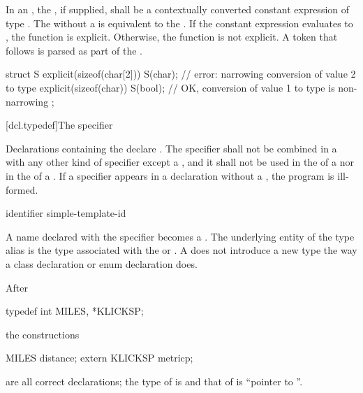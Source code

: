 \pnum
In an ,
the , if supplied, shall be a
contextually converted constant expression of type .
The  
without a  is equivalent to
the  .
If the constant expression evaluates to ,
the function is explicit. Otherwise, the function is not explicit.
A \tcode{(} token that follows  is parsed as
part of the .
\begin{example}
\begin{codeblock}
struct S {
  explicit(sizeof(char[2])) S(char);    // error: narrowing conversion of value 2 to type 
  explicit(sizeof(char)) S(bool);       // OK, conversion of value 1 to type  is non-narrowing
};
\end{codeblock}
\end{example}

[dcl.typedef]{The  specifier}%

\pnum
Declarations containing the  
declare .
The  specifier shall not be
combined in a  with any other kind of
specifier except a , and it shall not be used in the
 of a
 nor in the
 of a
.
If a  specifier appears in a declaration without a ,
the program is ill-formed.

\begin{bnf}
\br
    identifier\br
    simple-template-id
\end{bnf}

A name declared with the  specifier becomes a
.
The underlying entity of the type alias is
the type associated with the 
or .
%
%
A  does not introduce a new type the way a class
declaration or enum declaration does.
\begin{example}
After
\begin{codeblock}
typedef int MILES, *KLICKSP;
\end{codeblock}
the constructions
\begin{codeblock}
MILES distance;
extern KLICKSP metricp;
\end{codeblock}
are all correct declarations; the type of  is
 and that of  is ``pointer to ''.
\end{example}

